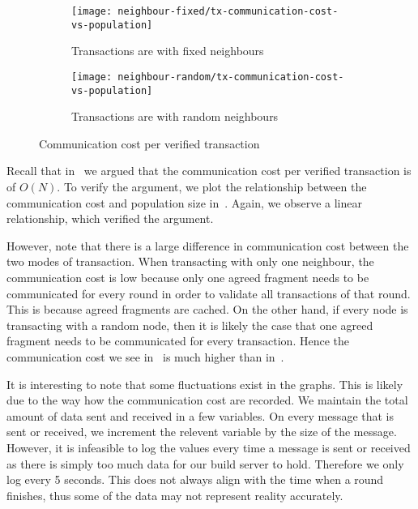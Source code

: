 \begin{figure}[h]
  \centering
  \begin{subfigure}{\textwidth}
    \texttt{[image: neighbour-fixed/tx-communication-cost-vs-population]}
    \caption{Transactions are with fixed neighbours}
    \label{fig:tx-comms-fixed}
  \end{subfigure}

  \begin{subfigure}{\textwidth}
    \texttt{[image: neighbour-random/tx-communication-cost-vs-population]}
    \caption{Transactions are with random neighbours}
    \label{fig:tx-comms-random}
  \end{subfigure}
  \caption{Communication cost per verified transaction}
  \label{fig:tx-comms}
\end{figure}

Recall that in~ we argued that the communication cost per verified transaction is of $O(N)$.
To verify the argument, we plot the relationship between the communication cost and population size in~.
Again, we observe a linear relationship, which verified the argument.

However, note that there is a large difference in communication cost between the two modes of transaction.
When transacting with only one neighbour, the communication cost is low because only one agreed fragment needs to be communicated for every round in order to validate all transactions of that round.
This is because agreed fragments are cached.
On the other hand,
if every node is transacting with a random node, then it is likely the case that one agreed fragment needs to be communicated for every transaction.
Hence the communication cost we see in~ is much higher than in~.

It is interesting to note that some fluctuations exist in the graphs.
This is likely due to the way how the communication cost are recorded.
We maintain the total amount of data sent and received in a few variables.
On every message that is sent or received, we increment the relevent variable by the size of the message.
However, it is infeasible to log the values every time a message is sent or received as there is simply too much data for our build server to hold.
Therefore we only log every 5 seconds.
This does not always align with the time when a round finishes, thus some of the data may not represent reality accurately.

